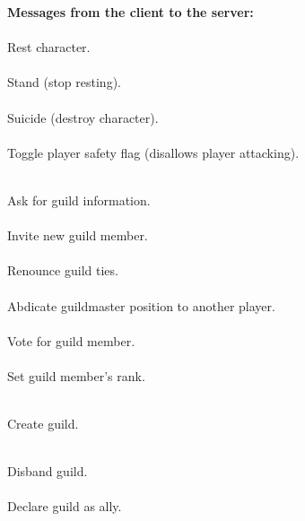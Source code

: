 \begin{protocol}
{\bf Messages from the client to the server:} \\

 \\
Rest character. \\

 \\
Stand (stop resting). \\

 \\
Suicide (destroy character). \\

  \\
Toggle player safety flag (disallows player attacking). \\

 \\
Ask for guild information. \\

  \\
Invite new guild member. \\

 \\
Renounce guild ties. \\

  \\
Abdicate guildmaster position to another player. \\

  \\
Vote for guild member. \\

   \\
Set guild member's rank. \\

    \\
Create guild. \\

 \\
Disband guild. \\

  \\
Declare guild as ally. \\


\end{protocol}
